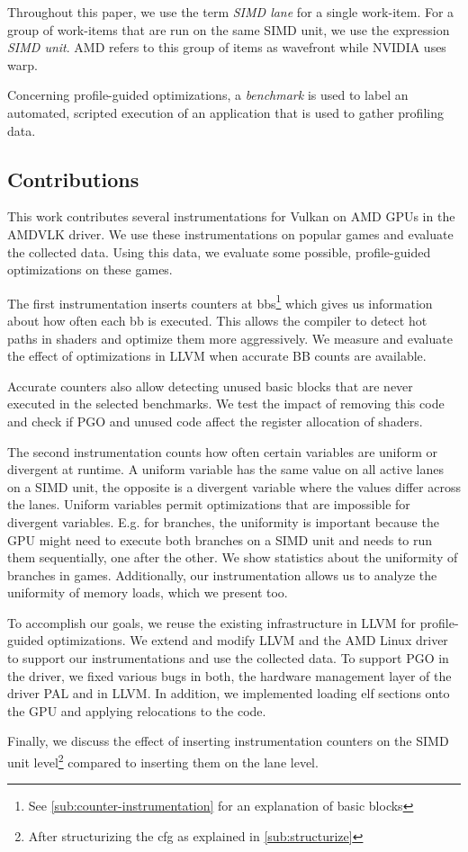 Throughout this paper, we use the term \emph{SIMD lane} for a single work-item.
For a group of work-items that are run on the same SIMD unit, we use the expression \emph{SIMD unit}.
AMD refers to this group of items as wavefront while NVIDIA uses warp.

Concerning profile-guided optimizations, a \emph{benchmark} is used to label an automated, scripted execution of an application that is used to gather profiling data.


\subsection{Contributions}
\label{sub:contributions}
This work contributes several instrumentations for Vulkan on AMD GPUs in the AMDVLK driver.
We use these instrumentations on popular games and evaluate the collected data.
Using this data, we evaluate some possible, profile-guided optimizations on these games.

The first instrumentation inserts counters at \glspl{bb}\footnote{See \cref{sub:counter-instrumentation} for an explanation of basic blocks} which gives us information about how often each \gls{bb} is executed.
This allows the compiler to detect hot paths in shaders and optimize them more aggressively.
We measure and evaluate the effect of optimizations in LLVM when accurate BB counts are available.

Accurate counters also allow detecting unused basic blocks that are never executed in the selected benchmarks. We test the impact of removing this code and check if PGO and unused code affect the register allocation of shaders.

The second instrumentation counts how often certain variables are uniform or divergent at runtime. A uniform variable has the same value on all active lanes on a SIMD unit, the opposite is a divergent variable where the values differ across the lanes.
Uniform variables permit optimizations that are impossible for divergent variables.
E.g. for branches, the uniformity is important because the GPU might need to execute both branches on a SIMD unit and needs to run them sequentially, one after the other.
We show statistics about the uniformity of branches in games.
Additionally, our instrumentation allows us to analyze the uniformity of memory loads, which we present too.

To accomplish our goals, we reuse the existing infrastructure in LLVM for profile-guided optimizations.
We extend and modify LLVM and the AMD Linux driver to support our instrumentations and use the collected data.
To support PGO in the driver, we fixed various bugs in both, the hardware management layer of the driver PAL and in LLVM.
In addition, we implemented loading \gls{elf} sections onto the GPU and applying relocations to the code.

Finally, we discuss the effect of inserting instrumentation counters on the SIMD unit level\footnote{After structurizing the \gls{cfg} as explained in \cref{sub:structurize}} compared to inserting them on the lane level.
